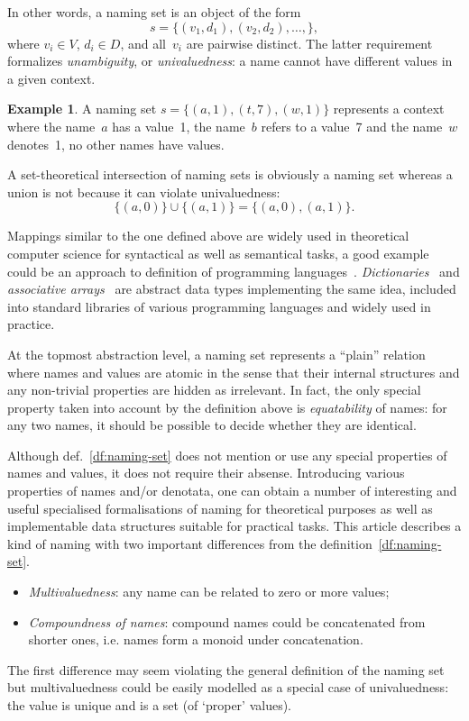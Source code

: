 \documentclass{article}
\theoremstyle{definition}
\newtheorem{Ex}{Example}
\begin{document}
In other words, a naming set is an object of the form
\[
  s = \{ (v_1, d_1), (v_2, d_2), \ldots, \} ,
\]
where $v_i\in V$, $d_i\in D$, and all~$v_i$ are pairwise distinct. The
latter requirement formalizes \emph{unambiguity}, or \emph{univaluedness}: a
name cannot have different values in a given context.

\begin{Ex}\label{ex:naming-set}
A naming set $s = \{ (a, 1), (t, 7), (w, 1) \}$ represents a context where
the name~$a$ has a value~1, the name~$b$ refers to a value~7 and the name~$w$
denotes~1, no other names have values.
\end{Ex}

A set-theoretical intersection  of naming sets is obviously a naming set
whe\-re\-as a union is not because it can violate univaluedness:
\[
  \{ (a, 0) \} \cup \{ (a, 1) \} = \{ (a, 0), (a, 1) \} .
\]

Mappings similar to the one defined above are widely used in theoretical
computer science for syntactical as well as semantical tasks, a good example
could be an approach to definition of programming
languages~\cite{bib:ollongren}.  \emph{Dictionaries}~\cite{bib:dictionary} and
\emph{associative arrays}~\cite{bib:mehlhorn-assoc} are abstract data types
implementing the same idea, included into standard libraries of various
programming languages and widely used in practice.

At the topmost abstraction level, a naming set represents a ``plain'' relation
where names and values are atomic in the sense that their internal structures
and any non-trivial properties are hidden as irrelevant.  In fact, the only
special property taken into account by the definition above is
\emph{equatability} of names: for any two names, it should be possible to
decide whether they are identical.

Although def.~\ref{df:naming-set} does not mention or use any special properties
of names and values, it does not require their absense.
Introducing various properties of names and/or denotata, one can obtain a
number of interesting and useful specialised formalisations of naming for
theoretical purposes as well as implementable data structures suitable for
practical tasks. This article describes a kind of naming with
two important differences from the definition~\ref{df:naming-set}.
\begin{itemize}
\item \emph{Multivaluedness}: any name can be related to zero or more values;
\item \emph{Compoundness of names}: compound names could be concatenated from
shorter ones, i.e. names form a monoid under concatenation.
\end{itemize}
The first difference may seem violating the general definition of the
naming set but multivaluedness could be easily modelled as a special case of
univaluedness: the value is unique and is a set (of `proper' values).
\end{document}
